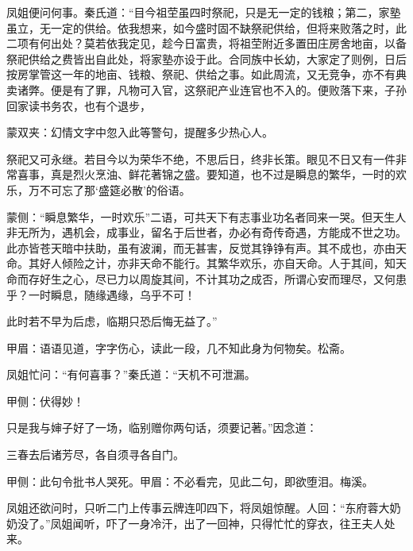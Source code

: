 \begin{parag}
    凤姐便问何事。秦氏道：“目今祖茔虽四时祭祀，只是无一定的钱粮；第二，家塾虽立，无一定的供给。依我想来，如今盛时固不缺祭祀供给，但将来败落之时，此二项有何出处？莫若依我定见，趁今日富贵，将祖茔附近多置田庄房舍地亩，以备祭祀供给之费皆出自此处，将家塾亦设于此。合同族中长幼，大家定了则例，日后按房掌管这一年的地亩、钱粮、祭祀、供给之事。如此周流，又无竞争，亦不有典卖诸弊。便是有了罪，凡物可入官，这祭祀产业连官也不入的。便败落下来，子孙回家读书务农，也有个退步，\begin{note}蒙双夹：幻情文字中忽入此等警句，提醒多少热心人。\end{note}祭祀又可永继。若目今以为荣华不绝，不思后日，终非长策。眼见不日又有一件非常喜事，真是烈火烹油、鲜花著锦之盛。要知道，也不过是瞬息的繁华，一时的欢乐，万不可忘了那‘盛筵必散’的俗语。\begin{note}蒙侧：“瞬息繁华，一时欢乐”二语，可共天下有志事业功名者同来一哭。但天生人非无所为，遇机会，成事业，留名于后世者，办必有奇传奇遇，方能成不世之功。此亦皆苍天暗中扶助，虽有波澜，而无甚害，反觉其铮铮有声。其不成也，亦由天命。其好人倾险之计，亦非天命不能行。其繁华欢乐，亦自天命。人于其间，知天命而存好生之心，尽已力以周旋其间，不计其功之成否，所谓心安而理尽，又何患乎？一时瞬息，随缘遇缘，乌乎不可！\end{note}此时若不早为后虑，临期只恐后悔无益了。”\begin{note}甲眉：语语见道，字字伤心，读此一段，几不知此身为何物矣。松斋。\end{note}凤姐忙问：“有何喜事？”秦氏道：“天机不可泄漏。\begin{note}甲侧：伏得妙！\end{note}只是我与婶子好了一场，临别赠你两句话，须要记著。”因念道：
\end{parag}


\begin{poem}
    \begin{pl}三春去后诸芳尽，各自须寻各自门。\end{pl}
    \begin{note}甲侧：此句令批书人哭死。甲眉：不必看完，见此二句，即欲堕泪。梅溪。\end{note}
\end{poem}


\begin{parag}
    凤姐还欲问时，只听二门上传事云牌连叩四下，将凤姐惊醒。人回：“东府蓉大奶奶没了。”凤姐闻听，吓了一身冷汗，出了一回神，只得忙忙的穿衣，往王夫人处来。
\end{parag}


